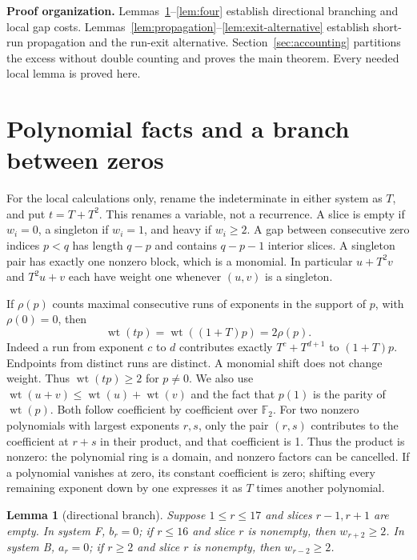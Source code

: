 \documentclass{article}
\newtheorem{lemma}{Lemma}
\DeclareMathOperator{\wt}{wt}
\begin{document}
\textbf{Proof organization.} Lemmas~\ref{lem:branch}--\ref{lem:four} establish directional
branching and local gap costs. Lemmas~\ref{lem:propagation}--\ref{lem:exit-alternative} establish
short-run propagation and the run-exit alternative. Section~\ref{sec:accounting} partitions the
excess without double counting and proves the main theorem. Every needed local lemma is proved
here.

\section{Polynomial facts and a branch between zeros}\label{sec:polynomial}

For the local calculations only, rename the indeterminate in either system as \(T\), and put
\(t = T + T^2\). This renames a variable, not a recurrence. A slice is empty if \(w_i = 0\), a
singleton if \(w_i = 1\), and heavy if \(w_i \ge 2\). A gap between consecutive zero indices
\(p < q\) has length \(q - p\) and contains \(q - p - 1\) interior slices. A singleton pair has
exactly one nonzero block, which is a monomial. In particular \(u + T^2 v\) and \(T^2 u + v\) each
have weight one whenever \((u,v)\) is a singleton.

If \(\rho(p)\) counts maximal consecutive runs of exponents in the support of \(p\), with
\(\rho(0) = 0\), then
\begin{equation}\label{eq:runs}
  \wt(tp) = \wt((1 + T)p) = 2\rho(p).
\end{equation}
Indeed a run from exponent \(c\) to \(d\) contributes exactly \(T^c + T^{d+1}\) to \((1 + T)p\).
Endpoints from distinct runs are distinct. A monomial shift does not change weight. Thus
\(\wt(tp) \ge 2\) for \(p \ne 0\). We also use \(\wt(u + v) \le \wt(u) + \wt(v)\) and the fact
that \(p(1)\) is the parity of \(\wt(p)\). Both follow coefficient by coefficient over
\(\mathbb{F}_2\). For two nonzero polynomials with largest exponents \(r, s\), only the pair
\((r,s)\) contributes to the coefficient at \(r + s\) in their product, and that coefficient is 1.
Thus the product is nonzero: the polynomial ring is a domain, and nonzero factors can be
cancelled. If a polynomial vanishes at zero, its constant coefficient is zero; shifting every
remaining exponent down by one expresses it as \(T\) times another polynomial.

\begin{lemma}[directional branch]\label{lem:branch}
  Suppose \(1 \le r \le 17\) and slices \(r - 1, r + 1\) are empty. In system F, \(b_r = 0\); if
  \(r \le 16\) and slice \(r\) is nonempty, then \(w_{r+2} \ge 2\). In system B, \(a_r = 0\); if
  \(r \ge 2\) and slice \(r\) is nonempty, then \(w_{r-2} \ge 2\).
\end{lemma}
\end{document}
